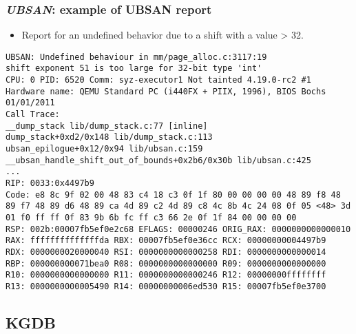 \begin{frame}[fragile]
  \frametitle{{\em UBSAN}: example of UBSAN report}
  \begin{itemize}
    \item Report for an undefined behavior due to a shift with a value > 32.
  \end{itemize}
  \begin{block}{}
    \begin{verbatim}
UBSAN: Undefined behaviour in mm/page_alloc.c:3117:19
shift exponent 51 is too large for 32-bit type 'int'
CPU: 0 PID: 6520 Comm: syz-executor1 Not tainted 4.19.0-rc2 #1
Hardware name: QEMU Standard PC (i440FX + PIIX, 1996), BIOS Bochs 01/01/2011
Call Trace:
__dump_stack lib/dump_stack.c:77 [inline]
dump_stack+0xd2/0x148 lib/dump_stack.c:113
ubsan_epilogue+0x12/0x94 lib/ubsan.c:159
__ubsan_handle_shift_out_of_bounds+0x2b6/0x30b lib/ubsan.c:425
...
RIP: 0033:0x4497b9
Code: e8 8c 9f 02 00 48 83 c4 18 c3 0f 1f 80 00 00 00 00 48 89 f8 48
89 f7 48 89 d6 48 89 ca 4d 89 c2 4d 89 c8 4c 8b 4c 24 08 0f 05 <48> 3d
01 f0 ff ff 0f 83 9b 6b fc ff c3 66 2e 0f 1f 84 00 00 00 00
RSP: 002b:00007fb5ef0e2c68 EFLAGS: 00000246 ORIG_RAX: 0000000000000010
RAX: ffffffffffffffda RBX: 00007fb5ef0e36cc RCX: 00000000004497b9
RDX: 0000000020000040 RSI: 0000000000000258 RDI: 0000000000000014
RBP: 000000000071bea0 R08: 0000000000000000 R09: 0000000000000000
R10: 0000000000000000 R11: 0000000000000246 R12: 00000000ffffffff
R13: 0000000000005490 R14: 00000000006ed530 R15: 00007fb5ef0e3700 
    \end{verbatim}
  \end{block}
\end{frame}



\subsection{KGDB}



